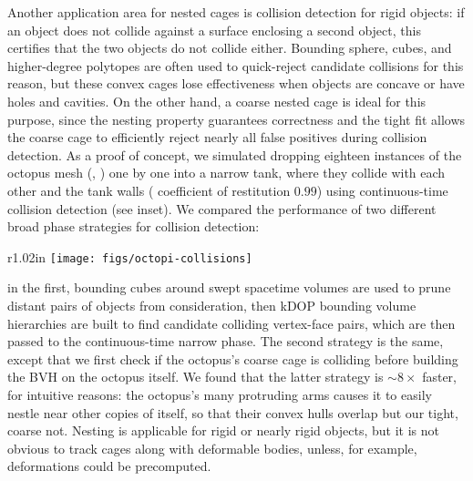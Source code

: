 Another application area for nested cages is collision detection for rigid
objects: if an object does not collide against a surface enclosing a second
object, 
this certifies that the two objects do not collide either.
%
Bounding sphere, cubes, and
higher-degree polytopes are often used to quick-reject candidate collisions for
this reason, but these convex cages lose effectiveness when objects are concave
or have holes and cavities. On the other hand, a coarse nested cage is ideal
for this purpose, since the nesting property guarantees correctness and the
tight fit allows the coarse cage to efficiently reject nearly all false
positives during collision detection. As a proof of concept, we simulated
dropping eighteen instances of the octopus mesh (,
) one by one into a narrow tank, where they collide with each other
and the tank walls ( coefficient of restitution $0.99$) using
continuous-time collision detection (see inset). We compared the performance of
two different broad phase strategies for collision detection: 
%
\begin{wrapfigure}[21]{r}{1.02in}
%
\vspace*{-5mm}
\centering
%
\texttt{[image: figs/octopi-collisions]}
%
\end{wrapfigure}
%
in the first,
bounding cubes around swept spacetime volumes are used to prune distant pairs
of objects from consideration, then kDOP bounding volume hierarchies are built
to find candidate colliding vertex-face pairs, which are then passed to the
continuous-time narrow phase. The second strategy is the same, except
that we first check if the octopus's coarse cage is colliding before building
the BVH on the octopus itself. We found that the latter strategy is 
$\sim 8\times$ faster, for intuitive reasons: the octopus's many
protruding arms causes it to easily nestle near other copies of itself, so that
their convex hulls overlap but our tight, coarse  not.
%
Nesting is applicable for rigid or nearly rigid objects, but it is not obvious
to track cages along with deformable bodies, unless, for example, deformations
could be precomputed.

